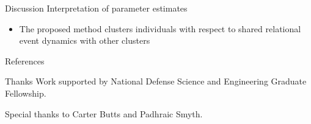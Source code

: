 \documentclass{beamer}
\begin{document}
\begin{frame}{Discussion}
Interpretation of parameter estimates
  \begin{itemize}
  \item The proposed method clusters individuals with respect to
    shared relational event dynamics with other clusters
  \end{itemize}


\end{frame}

\begin{frame}[allowframebreaks]{References}
\tiny


\end{frame}

\begin{frame}{Thanks}
Work supported by National Defense Science and Engineering Graduate
Fellowship.

\vspace{2cm}
Special thanks to Carter Butts and Padhraic Smyth.

\end{frame}
\end{document}
